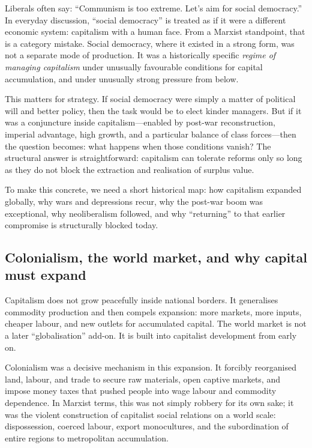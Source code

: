 Liberals often say: ``Communism is too extreme. Let's aim for social democracy.'' In everyday discussion,
``social democracy'' is treated as if it were a different economic system: capitalism with a human face.
From a Marxist standpoint, that is a category mistake. Social democracy, where it existed in a strong form,
was not a separate mode of production. It was a historically specific \emph{regime of managing capitalism}
under unusually favourable conditions for capital accumulation, and under unusually strong pressure from below.

This matters for strategy. If social democracy were simply a matter of political will and better policy,
then the task would be to elect kinder managers. But if it was a conjuncture inside capitalism—enabled by
post-war reconstruction, imperial advantage, high growth, and a particular balance of class forces—then the
question becomes: what happens when those conditions vanish? The structural answer is straightforward:
capitalism can tolerate reforms only so long as they do not block the extraction and realisation of surplus value.

To make this concrete, we need a short historical map: how capitalism expanded globally, why wars and depressions
recur, why the post-war boom was exceptional, why neoliberalism followed, and why ``returning'' to that earlier
compromise is structurally blocked today.

\subsection{Colonialism, the world market, and why capital must expand}
\label{subsec:colonialism-worldmarket}

Capitalism does not grow peacefully inside national borders. It generalises commodity production and then
compels expansion: more markets, more inputs, cheaper labour, and new outlets for accumulated capital.
The world market is not a later ``globalisation'' add-on. It is built into capitalist development from early on.

Colonialism was a decisive mechanism in this expansion. It forcibly reorganised land, labour, and trade to
secure raw materials, open captive markets, and impose money taxes that pushed people into wage labour and
commodity dependence. In Marxist terms, this was not simply robbery for its own sake; it was the violent
construction of capitalist social relations on a world scale: dispossession, coerced labour, export monocultures,
and the subordination of entire regions to metropolitan accumulation.

